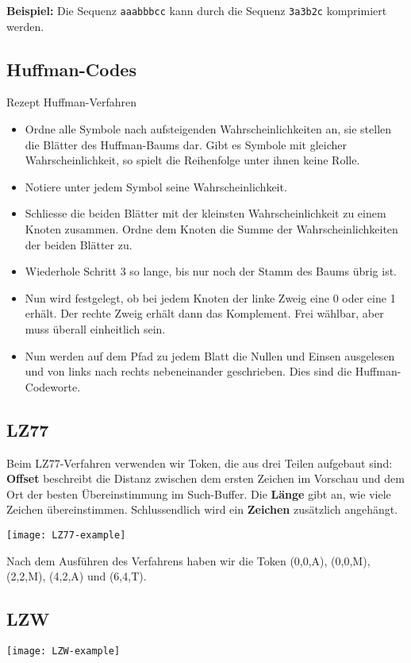 \textbf{Beispiel:} Die Sequenz \texttt{aaabbbcc} kann durch die Sequenz \texttt{3a3b2c} komprimiert werden.

\subsection{Huffman-Codes}\label{subsec:huffman-codes}

\begin{subbox}{Rezept Huffman-Verfahren}
    \begin{itemize}
        \item Ordne alle Symbole nach aufsteigenden Wahrscheinlichkeiten an, sie stellen die Blätter des Huffman-Baums dar.
        Gibt es Symbole mit gleicher Wahrscheinlichkeit, so spielt die Reihenfolge unter ihnen keine Rolle.
        \item Notiere unter jedem Symbol seine Wahrscheinlichkeit.
        \item Schliesse die beiden Blätter mit der kleinsten Wahrscheinlichkeit zu einem Knoten zusammen.
        Ordne dem Knoten die Summe der Wahrscheinlichkeiten der beiden Blätter zu.
        \item Wiederhole Schritt 3 so lange, bis nur noch der Stamm des Baums übrig ist.
        \item Nun wird festgelegt, ob bei jedem Knoten der linke Zweig eine 0 oder eine 1 erhält.
        Der rechte Zweig erhält dann das Komplement.
        Frei wählbar, aber muss überall einheitlich sein.
        \item Nun werden auf dem Pfad zu jedem Blatt die Nullen und Einsen ausgelesen und von links nach rechts nebeneinander geschrieben.
        Dies sind die Huffman-Codeworte.
    \end{itemize}
\end{subbox}

\subsection{LZ77}\label{subsec:lz77}

Beim LZ77-Verfahren verwenden wir Token, die aus drei Teilen aufgebaut sind: \textbf{Offset} beschreibt die Distanz zwischen dem ersten Zeichen im Vorschau und dem Ort der besten Übereinstimmung im Such-Buffer.
Die \textbf{Länge} gibt an, wie viele Zeichen übereinstimmen.
Schlussendlich wird ein \textbf{Zeichen} zusätzlich angehängt.
\begin{center}
    \texttt{[image: LZ77-example]}
\end{center}
Nach dem Ausführen des Verfahrens haben wir die Token (0,0,A), (0,0,M), (2,2,M), (4,2,A) und (6,4,T).

\subsection{LZW}\label{subsec:lzw}
\begin{center}
    \texttt{[image: LZW-example]}
\end{center}
